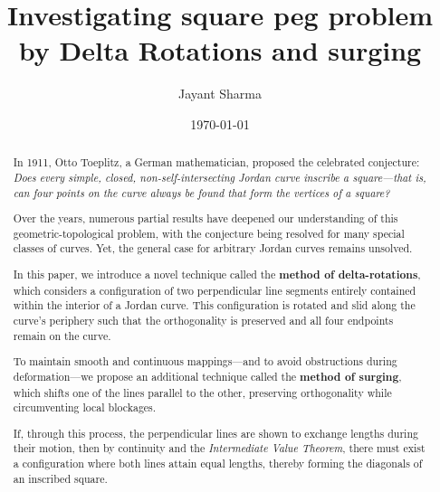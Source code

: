 \documentclass[9pt]{amsart}
\title{\textbf{Investigating square peg problem by Delta Rotations and surging}}
\author{Jayant Sharma}
\date{\today}
\theoremstyle{plain}
\begin{document}
\maketitle
\begin{abstract}
In 1911, Otto Toeplitz, a German mathematician, proposed the celebrated conjecture: \emph{Does every simple, closed, non-self-intersecting Jordan curve inscribe a square—that is, can four points on the curve always be found that form the vertices of a square?}

Over the years, numerous partial results have deepened our understanding of this geometric-topological problem, with the conjecture being resolved for many special classes of curves. Yet, the general case for arbitrary Jordan curves remains unsolved.

In this paper, we introduce a novel technique called the \textbf{method of delta-rotations}, which considers a configuration of two perpendicular line segments entirely contained within the interior of a Jordan curve. This configuration is rotated and slid along the curve’s periphery such that the orthogonality is preserved and all four endpoints remain on the curve.

To maintain smooth and continuous mappings—and to avoid obstructions during deformation—we propose an additional technique called the \textbf{method of surging}, which shifts one of the lines parallel to the other, preserving orthogonality while circumventing local blockages.

If, through this process, the perpendicular lines are shown to exchange lengths during their motion, then by continuity and the \emph{Intermediate Value Theorem}, there must exist a configuration where both lines attain equal lengths, thereby forming the diagonals of an inscribed square.
\end{abstract}
\tableofcontents

\nocite{*}





\end{document}
